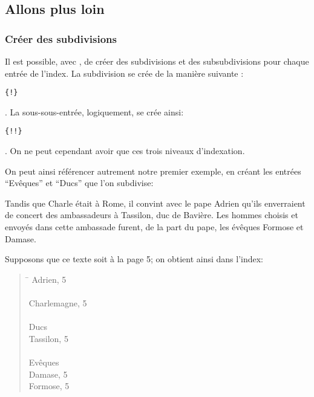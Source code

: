 \subsection{Allons plus loin}
\subsubsection{Créer des subdivisions}

Il est possible, avec ,  de créer des subdivisions et des subsubdivisions  pour chaque entrée de l'index. La subdivision se crée de la manière suivante : \begin{english}\verb|{|\verb|!|\verb|}|\end{english}. La sous-sous-entrée, logiquement, se crée ainsi: \begin{english}\verb|{|\verb|!|\verb|!|\verb|}|\end{english}. On ne peut cependant avoir que ces trois niveaux d'indexation.

On peut ainsi référencer autrement notre premier exemple, en créant les entrées \enquote{Evêques} et \enquote{Ducs} que l'on subdivise:

\begin{latexcode}
Tandis que Charle était à Rome, il convint 
avec le pape Adrien qu’ils enverraient de concert 
des ambassadeurs à Tassilon, duc de Bavière.
\textelp{}
Les hommes choisis et envoyés dans cette ambassade furent, de la 
part du pape, les évêques Formose
et Damase\textelp{}.
\end{latexcode}


Supposons que ce texte soit à la page 5; on obtient ainsi dans l'index:
\begin{quotation}
\begin{tabbing}
\hspace{0,5cm}  \= \kill
Adrien, 5 \\
\\
Charlemagne, 5 \\
\\
Ducs \\
\> Tassilon, 5\\
\\
Evêques \\
\> Damase, 5\\
\> Formose, 5\\
\end{tabbing}
\end{quotation}



